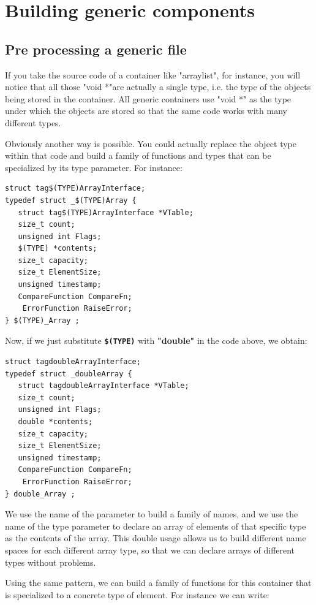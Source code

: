 \documentclass[12pt,a4paper,openany]{memoir} %
\begin{document}
{{\chapter{Building generic components}
\section{Pre processing a generic file}
If you take the source code of a container like "arraylist", for instance, you will notice that all those "void *"are actually a single type, i.e. the type of the objects being stored in the container.  All generic containers use "void *" as the type under which the objects are stored so that the same code works with many different types.

Obviously another way is possible. You could actually replace the object type within that code and build a family of functions and types that can be specialized by its type parameter. For instance:
\begin{verbatim}
struct tag$(TYPE)ArrayInterface;
typedef struct _$(TYPE)Array {
   struct tag$(TYPE)ArrayInterface *VTable; 
   size_t count;
   unsigned int Flags;
   $(TYPE) *contents;
   size_t capacity;
   size_t ElementSize;
   unsigned timestamp;
   CompareFunction CompareFn; 
    ErrorFunction RaiseError;
} $(TYPE)_Array ;
\end{verbatim}
Now, if we just substitute \textbf{ \texttt{\$(TYPE)}} with \textbf{"double"} in the code above, we obtain:

\begin{verbatim}
struct tagdoubleArrayInterface;
typedef struct _doubleArray {
   struct tagdoubleArrayInterface *VTable; 
   size_t count;
   unsigned int Flags;
   double *contents;
   size_t capacity;
   size_t ElementSize;
   unsigned timestamp;
   CompareFunction CompareFn; 
    ErrorFunction RaiseError;
} double_Array ;
\end{verbatim}

We use the name of the parameter to build a family of names, and we use the name of the type parameter to declare an array of elements of that specific type as the contents of the array. This double usage allows us to build different name spaces for each different array type, so that we can declare arrays of different types without problems.

Using the same pattern, we can build a family of functions for this container that is specialized to a concrete type of element. For instance we can write:

}}
\end{document}
